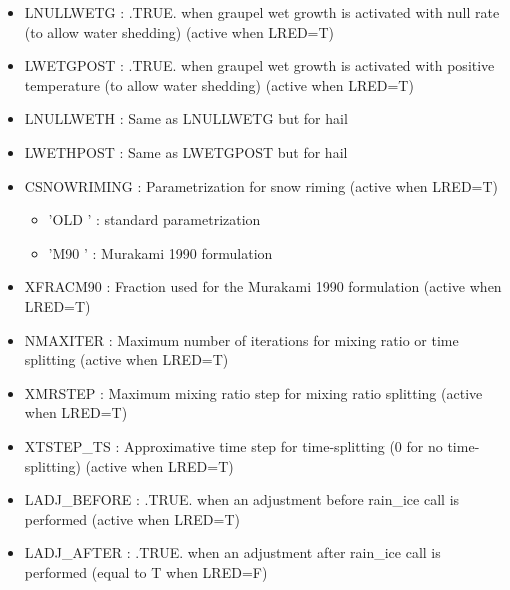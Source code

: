 \begin{itemize}
\item 
LNULLWETG  : .TRUE. when graupel wet growth is activated with null rate (to allow water shedding) (active when LRED=T)

\item 
LWETGPOST  : .TRUE. when graupel wet growth is activated with positive temperature (to allow water shedding) (active when LRED=T)
 
\item 
LNULLWETH  : Same as LNULLWETG but for hail

\item 
LWETHPOST  : Same as LWETGPOST but for hail

\item 
CSNOWRIMING  :  Parametrization for snow riming (active when LRED=T)
\begin{itemize}
\item{'OLD '} : standard parametrization
\item{'M90 '} : Murakami 1990 formulation
\end{itemize}

\item 
XFRACM90 : Fraction used for the Murakami 1990 formulation (active when LRED=T)

\item 
NMAXITER  : Maximum number of iterations for mixing ratio or time splitting (active when LRED=T)

\item 
XMRSTEP  : Maximum mixing ratio step for mixing ratio splitting (active when LRED=T)

\item 
XTSTEP\_TS  : Approximative time step for time-splitting (0 for no time-splitting) (active when LRED=T)

\item 
LADJ\_BEFORE  : .TRUE. when an adjustment before rain\_ice call is performed (active when LRED=T)

\item 
LADJ\_AFTER  : .TRUE. when an adjustment after rain\_ice call is performed (equal to T when LRED=F)


\end{itemize}
